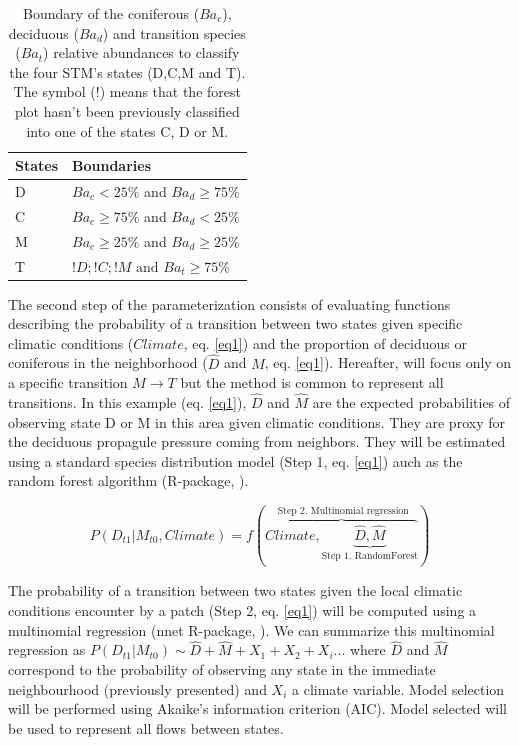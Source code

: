 \begin{table}[h]
\vspace{-1em}
\centering
\caption{Boundary of the coniferous ($Ba_c$), deciduous ($Ba_d$) and transition species ($Ba_t$) relative abundances to classify the four STM's states (D,C,M and T). The symbol ($!$) means that the forest plot hasn't been previously classified into one of the states C, D or M.}
\vspace{-1em}
\small
\begin{tabular}{|l|l|}
	\hline
	\textbf{States}  & \textbf{Boundaries}                            \\
	\hline
	D & $Ba_c< 25\%$ and $Ba_d \geq 75\%$    \\
	C & $Ba_c \geq 75\%$ and $Ba_d < 25\%$    \\
	M & $Ba_c \geq 25\%$ and $Ba_d \geq 25\%$ \\
	T & $!D;!C;!M \text{ and }  Ba_t  \geq 75\%$ \\
	\hline                               
\end{tabular}

\label{bound}
\end{table}

The second step of the parameterization consists of evaluating functions
describing the probability of a transition between two states given specific
climatic conditions ($Climate$, eq. \ref{eq1}) and the proportion of deciduous
or coniferous in the neighborhood ($\hat{D}$ and $\hat{M}$, eq. \ref{eq1}).
Hereafter, will focus only on a specific transition $M \rightarrow T$ but the
method is common to represent  all transitions. In this example (eq.
\ref{eq1}),  $\hat{D}$ and $\hat{M}$ are the expected probabilities of
observing state D or M in this area given climatic conditions. They are proxy
for the deciduous propagule pressure coming from neighbors. They will be
estimated using  a standard species distribution model (Step 1, eq. \ref{eq1})
auch as the random forest algorithm (R-package, \cite{Liaw2002a}).

\begin{equation}
	P(D_{t1}|M_{t0}, Climate) = f(\overbrace{Climate, \underbrace{\hat{D}, \hat{M}}_\text{Step 1. RandomForest}}^\text{ Step 2. Multinomial regression})
\label{eq1}
\end{equation}

The probability of a transition between two states given the local climatic
conditions encounter by a patch (Step 2, eq. \ref{eq1}) will be computed using a multinomial
regression (nnet R-package, \cite{Venables2002}). We can summarize this
multinomial regression as $P(D_{t1}|M_{t0}) \sim \hat{D} + \hat{M} +
X_1+X_2+X_i... $ where $\hat{D}$ and $\hat{M}$ correspond to the probability
of observing any state in the immediate neighbourhood (previously presented)
and $X_i$ a climate variable. Model selection will be performed using Akaike's
information criterion (AIC). Model selected will be used to represent all
flows between states.   \\

